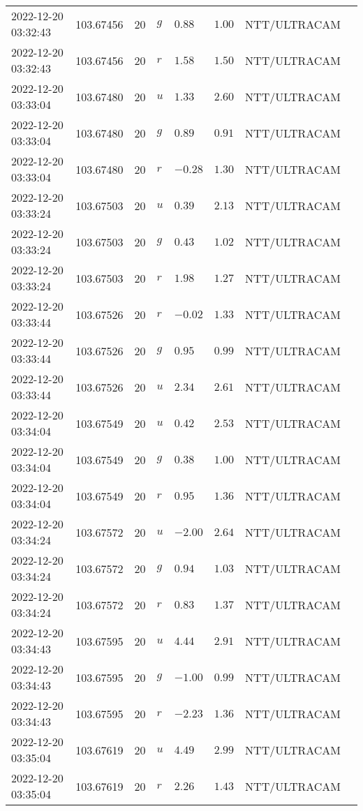 \documentclass{nature_plusfigure}
\begin{document}
\begin{supplement}
\begin{center}
\begin{longtable}{llllllll}
2022-12-20 03:32:43 & 103.67456 & 20 & $g$ & $0.88$ & $1.00$ & NTT/ULTRACAM &  \\ 
2022-12-20 03:32:43 & 103.67456 & 20 & $r$ & $1.58$ & $1.50$ & NTT/ULTRACAM &  \\ 
2022-12-20 03:33:04 & 103.67480 & 20 & $u$ & $1.33$ & $2.60$ & NTT/ULTRACAM &  \\ 
2022-12-20 03:33:04 & 103.67480 & 20 & $g$ & $0.89$ & $0.91$ & NTT/ULTRACAM &  \\ 
2022-12-20 03:33:04 & 103.67480 & 20 & $r$ & $-0.28$ & $1.30$ & NTT/ULTRACAM &  \\ 
2022-12-20 03:33:24 & 103.67503 & 20 & $u$ & $0.39$ & $2.13$ & NTT/ULTRACAM &  \\ 
2022-12-20 03:33:24 & 103.67503 & 20 & $g$ & $0.43$ & $1.02$ & NTT/ULTRACAM &  \\ 
2022-12-20 03:33:24 & 103.67503 & 20 & $r$ & $1.98$ & $1.27$ & NTT/ULTRACAM &  \\ 
2022-12-20 03:33:44 & 103.67526 & 20 & $r$ & $-0.02$ & $1.33$ & NTT/ULTRACAM &  \\ 
2022-12-20 03:33:44 & 103.67526 & 20 & $g$ & $0.95$ & $0.99$ & NTT/ULTRACAM &  \\ 
2022-12-20 03:33:44 & 103.67526 & 20 & $u$ & $2.34$ & $2.61$ & NTT/ULTRACAM &  \\ 
2022-12-20 03:34:04 & 103.67549 & 20 & $u$ & $0.42$ & $2.53$ & NTT/ULTRACAM &  \\ 
2022-12-20 03:34:04 & 103.67549 & 20 & $g$ & $0.38$ & $1.00$ & NTT/ULTRACAM &  \\ 
2022-12-20 03:34:04 & 103.67549 & 20 & $r$ & $0.95$ & $1.36$ & NTT/ULTRACAM &  \\ 
2022-12-20 03:34:24 & 103.67572 & 20 & $u$ & $-2.00$ & $2.64$ & NTT/ULTRACAM &  \\ 
2022-12-20 03:34:24 & 103.67572 & 20 & $g$ & $0.94$ & $1.03$ & NTT/ULTRACAM &  \\ 
2022-12-20 03:34:24 & 103.67572 & 20 & $r$ & $0.83$ & $1.37$ & NTT/ULTRACAM &  \\ 
2022-12-20 03:34:43 & 103.67595 & 20 & $u$ & $4.44$ & $2.91$ & NTT/ULTRACAM &  \\ 
2022-12-20 03:34:43 & 103.67595 & 20 & $g$ & $-1.00$ & $0.99$ & NTT/ULTRACAM &  \\ 
2022-12-20 03:34:43 & 103.67595 & 20 & $r$ & $-2.23$ & $1.36$ & NTT/ULTRACAM &  \\ 
2022-12-20 03:35:04 & 103.67619 & 20 & $u$ & $4.49$ & $2.99$ & NTT/ULTRACAM &  \\ 
2022-12-20 03:35:04 & 103.67619 & 20 & $r$ & $2.26$ & $1.43$ & NTT/ULTRACAM &  \\ 

\end{longtable}
\end{center}
\end{supplement}
\end{document}
